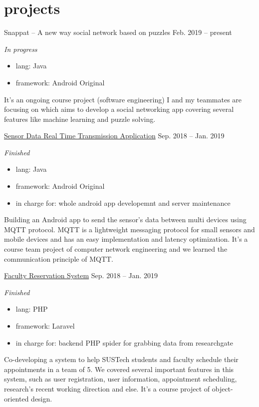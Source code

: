\documentclass[hidelinks__VERSION__]{adamyi-cv}
\begin{document}
\pagebreak


\section{projects}

\begin{entrylist}


\entry
{Snappat -- A new way social network based on puzzles}
{Feb. 2019 -- present}
{\emph{In progress}
\begin{itemize}
    \item lang: Java
    \item framework: Android Original
\end{itemize}
It's an ongoing course project (software engineering) I and my teammates are focusing on which aims to develop a social networking app covering several features like machine learning and puzzle solving.
}


\entry
{\href{https://github.com/hackroid/MqttSensorDemo}{Sensor Data Real Time Transmission Application}}
{Sep. 2018 -- Jan. 2019}
{\emph{Finished}
\begin{itemize}
    \item lang: Java
    \item framework: Android Original
    \item in charge for: whole android app developemnt and server maintenance
\end{itemize}
Building an Android app to send the sensor's data between multi devices using MQTT protocol. MQTT is a lightweight messaging protocol for small sensors and mobile devices and has an easy implementation and latency optimization. It's a course team project of computer network engineering and we learned the communication principle of MQTT.
}


\entry
{\href{https://github.com/zhaoweizhong/Faculty-Reservation}{Faculty Reservation System}}
{Sep. 2018 -- Jan. 2019}
{\emph{Finished}
\begin{itemize}
    \item lang: PHP
    \item framework: Laravel
    \item in charge for: backend PHP spider for grabbing data from researchgate
\end{itemize}
Co-developing a system to help SUSTech students and faculty schedule their appointments in a team of 5. We covered several important features in this system, such as user registration, user information, appointment scheduling, research's recent working direction and else. It's a course project of object-oriented design.
}



\end{entrylist}
\end{document}
